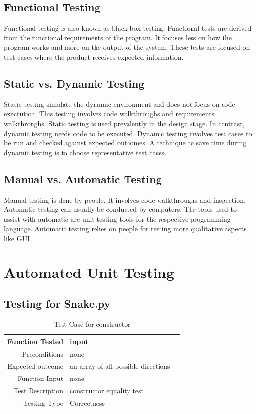 \documentclass[12pt]{article}
\begin{document}
\subsection{Functional Testing}
Functional testing is also known as black box testing. Functional tests are derived from the functional requirements of the program. It focuses less on how the program works and more on the output of the system. These tests are focused on test cases where the product receives expected information.
\subsection{Static vs. Dynamic Testing}
Static testing simulate the dynamic environment and does not focus on code exectution. This testing involves code walkthroughs and requirements walkthroughs. Static testing is used prevalently in the design stage. In contrast, dynamic testing needs code to be executed. \newline\newline
Dynamic testing involves test cases to be run and checked against expected outcomes. A technique to save time during dynamic testing is to choose representative test cases. 
\subsection{Manual vs. Automatic Testing}
Manual testing is done by people. It involves code walkthroughs and inspection. \newline\newline
Automatic testing can usually be conducted by computers. The tools used to assist with automatic are unit testing tools for the respective programming language. Automatic testing relies on people for testing more qualitative aspects like GUI. 


\section{Automated Unit Testing}
\subsection{Testing for Snake.py}
\begin{center}
	\begin{longtable}{ | r | p{4cm} | p{4cm} }
	\caption{Test Case for constructor} \\ \hline \label{TblInputVar} 
	Function Tested & input\\ \hline
	Preconditions & none \\ \hline
	Expected outcome & an array of all possible directions \\ \hline
	Function Input & none \\ \hline
	Test Description & constructor equality test\\ \hline
	Testing Type & Correctness\\ \hline
	
	\end{longtable}
\end{center}
\end{document}

